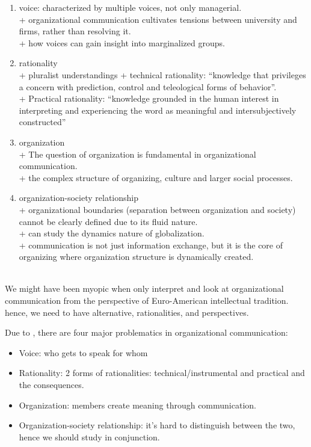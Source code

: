 \documentclass[
]{book}
\providecommand{\tightlist}{%
  \setlength{\itemsep}{0pt}\setlength{\parskip}{0pt}}
\begin{document}
\begin{enumerate}
\def\labelenumi{\arabic{enumi}.}
\tightlist
\item
  voice: characterized by multiple voices, not only managerial.\\
  + organizational communication cultivates tensions between university and firms, rather than resolving it.\\
  + how voices can gain insight into marginalized groups.\\
\item
  rationality\\
  + pluralist understandings
  + technical rationality: ``knowledge that privileges a concern with prediction, control and teleological forms of behavior''.\\
  + Practical rationality: ``knowledge grounded in the human interest in interpreting and experiencing the word as meaningful and intersubjectively constructed''\\
\item
  organization\\
  + The question of organization is fundamental in organizational communication.\\
  + the complex structure of organizing, culture and larger social processes.\\
\item
  organization-society relationship\\
  + organizational boundaries (separation between organization and society) cannot be clearly defined due to its fluid nature.\\
  + can study the dynamics nature of globalization.\\
  + communication is not just information exchange, but it is the core of organizing where organization structure is dynamically created.
\end{enumerate}

\citep{Broadfoot_2007}~\\
We might have been myopic when only interpret and look at organizational communication from the perspective of Euro-American intellectual tradition. hence, we need to have alternative, rationalities, and perspectives.

Due to \citep{Mumby_1996}, there are four major problematics in organizational communication:

\begin{itemize}
\tightlist
\item
  Voice: who gets to speak for whom\\
\item
  Rationality: 2 forms of rationalities: technical/instrumental and practical and the consequences.\\
\item
  Organization: members create meaning through communication.\\
\item
  Organization-society relationship: it's hard to distinguish between the two, hence we should study in conjunction.
\end{itemize}
\end{document}
